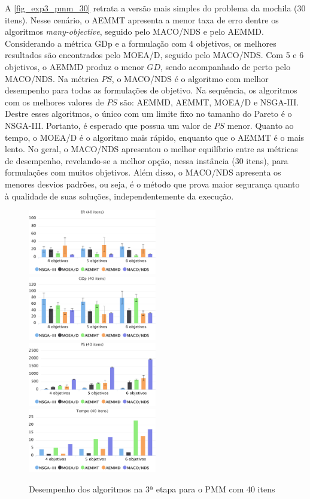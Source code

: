 A \autoref{fig_exp3_pmm_30} retrata a versão mais simples do problema da mochila (30 itens). Nesse cenário, o AEMMT apresenta a menor taxa de erro dentre os algoritmos \textit{many-objective}, seguido pelo MACO/NDS e pelo AEMMD. Considerando a métrica GDp e a formulação com 4 objetivos, os melhores resultados são encontrados pelo MOEA/D, seguido pelo MACO/NDS. Com 5 e 6 objetivos, o AEMMD produz o menor $GD$, sendo acompanhado de perto pelo MACO/NDS. Na métrica $PS$, o MACO/NDS é o algoritmo com melhor desempenho para todas as formulações de objetivo. Na sequência, os algoritmos com os melhores valores de $PS$ são: AEMMD, AEMMT, MOEA/D e NSGA-III. Destre esses algoritmos, o único com um limite fixo no tamanho do Pareto é o NSGA-III. Portanto, é esperado que possua um valor de $PS$ menor. Quanto ao tempo, o MOEA/D é o algoritmo mais rápido, enquanto que o AEMMT é o mais lento. No geral, o MACO/NDS apresentou o melhor equilíbrio entre as métricas de desempenho, revelando-se a melhor opção, nessa instância (30 itens), para formulações com muitos objetivos. Além disso, o MACO/NDS apresenta os menores desvios padrões, ou seja, é o método que prova maior segurança quanto à qualidade de suas soluções, independentemente da execução.

\begin{figure}[!htbp]	
	\includegraphics[width=0.5\textwidth]{cap_experimentos/figs/etapa3/er-mkp-40}
	\includegraphics[width=0.5\textwidth]{cap_experimentos/figs/etapa3/gd-mkp-40}
	\includegraphics[width=0.5\textwidth]{cap_experimentos/figs/etapa3/ps-mkp-40}
	\includegraphics[width=0.5\textwidth]{cap_experimentos/figs/etapa3/time-mkp-40}
	\caption{\label{fig_exp3_pmm_40}Desempenho dos algoritmos na 3ª etapa para o PMM com 40 itens}
\end{figure}

